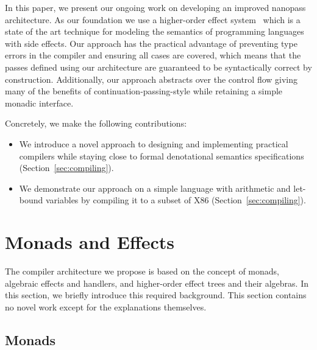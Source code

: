 \documentclass[a4paper,UKenglish,cleveref, autoref, thm-restate]{oasics-v2021}
\begin{document}
In this paper, we present our ongoing work on developing an improved nanopass architecture.
As our foundation we use a higher-order effect system~\cite{10.1145/3571255} which is a state of the art technique for modeling the semantics of programming languages with side effects.
Our approach has the practical advantage of preventing type errors in the compiler and ensuring all cases are covered, which means that the passes defined using our architecture are guaranteed to be syntactically correct by construction.
Additionally, our approach abstracts over the control flow giving many of the benefits of continuation-passing-style while retaining a simple monadic interface.

\noindent
Concretely, we make the following contributions:
\begin{itemize}
  \item We introduce a novel approach to designing and implementing practical compilers while staying close to formal denotational semantics specifications (Section~\ref{sec:compiling}). 
  \item We demonstrate our approach on a simple language with arithmetic and let-bound variables by compiling it to a subset of X86 (Section~\ref{sec:compiling}).
\end{itemize}

\section{Monads and Effects}

The compiler architecture we propose is based on the concept of monads, algebraic effects and handlers, and higher-order effect trees and their algebras.
In this section, we briefly introduce this required background.
This section contains no novel work except for the explanations themselves.

\subsection{Monads}
\end{document}
